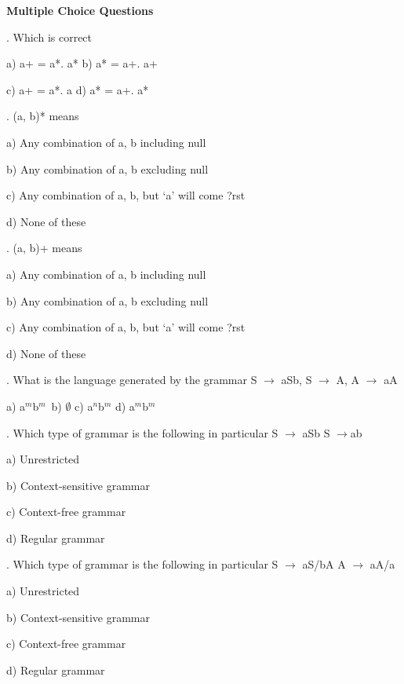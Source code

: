 \documentclass{article} %
\begin{document}
\noindent 

\noindent \textbf{Multiple Choice Questions}

\noindent 

\noindent 

\noindent 

. Which is correct                                                                 

\noindent  a) a+ = a*. a*    b) a* = a+. a+ 

\noindent c) a+ = a*. a       d) a* = a+. a*

. (a, b)* means 

\noindent a) Any combination of a, b including null 

\noindent b) Any combination of a, b excluding null 

\noindent c) Any combination of a, b, but `a' will come ?rst 

\noindent d) None of these 

. (a, b)+ means

\noindent  a) Any combination of a, b including null 

\noindent b) Any combination of a, b excluding null 

\noindent c) Any combination of a, b, but `a' will come ?rst

\noindent  d) None of these

\noindent 

\noindent 

\noindent 

\noindent 

\noindent 

\noindent 

\noindent 

\noindent 

\noindent 

\noindent 

\noindent 

\noindent 

\noindent 

. What is the language generated by the grammar S $\mathrm{\to}$ aSb, S $\mathrm{\to}$ A, A $\mathrm{\to}$ aA

\noindent  a) a${}^{m}$b${}^{m\ }$     b) $\mathrm{\emptyset }$     c) a${}^{n}$b${}^{m}$    d) a${}^{m}$b${}^{m}$ 

. Which type of grammar is the following in particular S $\mathrm{\to}$ aSb S $\mathrm{\to}$ab

\noindent  a) Unrestricted    

\noindent b) Context-sensitive grammar

\noindent  c) Context-free grammar

\noindent  d) Regular grammar 

. Which type of grammar is the following in particular S $\mathrm{\to}$ aS/bA  A $\mathrm{\to}$ aA/a

\noindent  a) Unrestricted

\noindent  b) Context-sensitive grammar 

\noindent c) Context-free grammar

\noindent  d) Regular grammar
\end{document}
